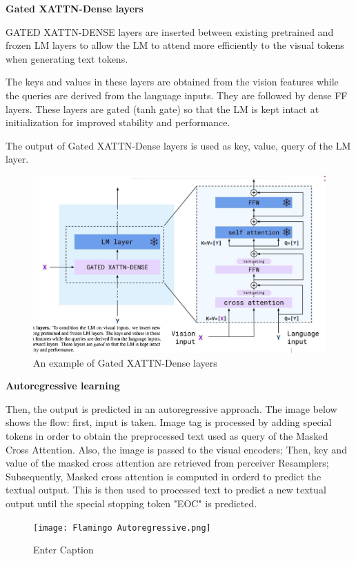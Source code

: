 \textbf{Gated XATTN-Dense layers}

GATED XATTN-DENSE layers are inserted between existing pretrained and frozen LM layers to allow the LM to attend more efficiently to the visual tokens when generating text tokens.

The keys and values in these layers are obtained from the vision features while the queries are derived from the language inputs. They are followed by dense FF layers. These layers are gated (tanh gate) so that the LM is kept intact at initialization for improved stability and performance.

The output of Gated XATTN-Dense layers is used as key, value, query of the LM layer.

\begin{figure}[H]
    \centering
    \includegraphics[width=1\linewidth]{tikz/Gated XATTN-Dense layers.png}
    \caption{An example of Gated XATTN-Dense layers}
    \label{fig:Gated-XATTN-Dense-layers}
\end{figure}

\textbf{Autoregressive learning}

Then, the output is predicted in an autoregressive approach. The image below shows the flow: first, input is taken. Image tag is processed by adding special tokens in order to obtain the preprocessed text used as query of the Masked Cross Attention. Also, the image is passed to the visual encoders; Then, key and value of the masked cross attention are retrieved from perceiver Resamplers; Subsequently, Masked cross attention is computed in orderd to predict the textual output. This is then used to processed text to predict a new textual output until the special stopping token "EOC" is predicted.


\begin{figure}[H]
    \centering
    \texttt{[image: Flamingo Autoregressive.png]}
    \caption{Enter Caption}
    \label{fig:enter-label}
\end{figure}

